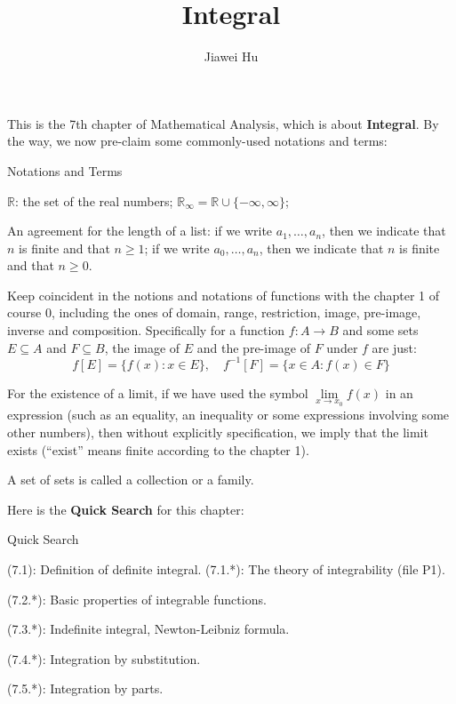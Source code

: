 \documentclass{article}
\title{\LARGE \textbf{Integral}}
\author{\large Jiawei Hu}
\begin{document}
\maketitle

This is the 7th chapter of Mathematical Analysis, which is about \textbf{Integral}. By the way, we now pre-claim some commonly-used notations and terms:
\begin{Df}{Notations and Terms}
    \begin{compactenum}
        \item $\mathbb{R}$: the set of the real numbers; $\mathbb{R}_\infty = \mathbb{R}\cup\{-\infty, \infty\}$;
        \item An agreement for the length of a list: if we write $a_1, \dots, a_n$, then we indicate that $n$ is finite and that $n\geq 1$; if we write $a_0, \dots, a_n$, then we indicate that $n$ is finite and that $n\geq 0$.
        \item Keep coincident in the notions and notations of functions with the chapter 1 of course 0, including the ones of domain, range, restriction, image, pre-image, inverse and composition. Specifically for a function $f: A\rightarrow B$ and some sets $E\subseteq A$ and $F\subseteq B$, the image of $E$ and the pre-image of $F$ under $f$ are just:
        $$f[E] = \{f(x): x\in E\},\quad f^{-1}[F] = \{x\in A: f(x)\in F\}$$
        \item For the existence of a limit, if we have used the symbol $\lim\limits_{x\to x_0} f(x)$ in an expression (such as an equality, an inequality or some expressions involving some other numbers), then without explicitly specification, we imply that the limit exists (``exist'' means finite according to the chapter 1).
        \item A set of sets is called a collection or a family.
    \end{compactenum}
\end{Df}

Here is the \textbf{Quick Search} for this chapter:
\begin{Th}{Quick Search}
    \begin{compactdesc}
        \item (7.1): Definition of definite integral.
            \subitem (7.1.*): The theory of integrability (file P1).
        \item (7.2.*): Basic properties of integrable functions.
        \item (7.3.*): Indefinite integral, Newton-Leibniz formula.
        \item (7.4.*): Integration by substitution.
        \item (7.5.*): Integration by parts.
    \end{compactdesc}
\end{Th}
\end{document}
